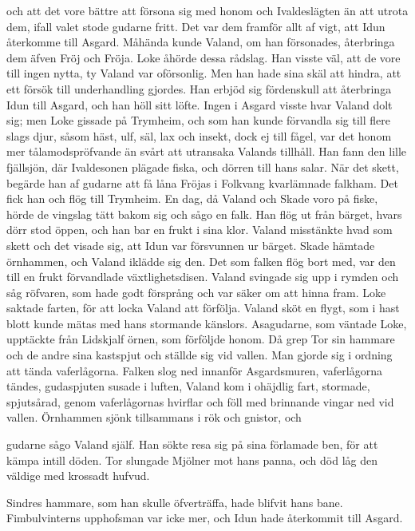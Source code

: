 och att det vore bättre att försona sig med honom och Ivaldeslägten än
att utrota dem, ifall valet stode gudarne fritt. Det var dem framför
allt af vigt, att Idun återkomme till Asgard. Måhända kunde Valand, om
han försonades, återbringa dem äfven Fröj och Fröja. Loke åhörde dessa
rådslag. Han visste väl, att de vore till ingen nytta, ty Valand var
oförsonlig. Men han hade sina skäl att hindra, att ett försök till
underhandling gjordes. Han erbjöd sig fördenskull att återbringa Idun
till Asgard, och han höll sitt löfte. Ingen i Asgard visste hvar Valand
dolt sig; men Loke gissade på Trymheim, och som han kunde förvandla sig
till flere slags djur, såsom häst, ulf, säl, lax och insekt, dock ej
till fågel, var det honom mer tålamodspröfvande än svårt att utransaka
Valands tillhåll. Han fann den lille fjällsjön, där Ivaldesonen plägade
fiska, och dörren till hans salar. När det skett, begärde han af gudarne
att få låna Fröjas i Folkvang kvarlämnade falkham. Det fick han och flög
till Trymheim. En dag, då Valand och Skade voro på fiske, hörde de
vingslag tätt bakom sig och sågo en falk. Han flög ut från bärget, hvars
dörr stod öppen, och han bar en frukt i sina klor. Valand misstänkte
hvad som skett och det visade sig, att Idun var försvunnen ur bärget.
Skade hämtade örnhammen, och Valand iklädde sig den. Det som falken flög
bort med, var den till en frukt förvandlade växtlighetsdisen. Valand
svingade sig upp i rymden och såg röfvaren, som hade godt försprång och
var säker om att hinna fram. Loke saktade farten, för att locka Valand
att förfölja. Valand sköt en flygt, som i hast blott kunde mätas med
hans stormande känslors. Asagudarne, som väntade Loke, upptäckte från
Lidskjalf örnen, som förföljde honom. Då grep Tor sin hammare och de
andre sina kastspjut och ställde sig vid vallen. Man gjorde sig i
ordning att tända vaferlågorna. Falken slog ned innanför Asgardsmuren,
vaferlågorna tändes, gudaspjuten susade i luften, Valand kom i ohäjdlig
fart, stormade, spjutsårad, genom vaferlågornas hvirflar och föll med
brinnande vingar ned vid vallen. Örnhammen sjönk tillsammans i rök och
gnistor, och

gudarne sågo Valand själf. Han sökte resa sig på sina förlamade ben, för
att kämpa intill döden. Tor slungade Mjölner mot hans panna, och död låg
den väldige med krossadt hufvud.

Sindres hammare, som han skulle öfverträffa, hade blifvit hans bane.
Fimbulvinterns upphofsman var icke mer, och Idun hade återkommit till
Asgard.



